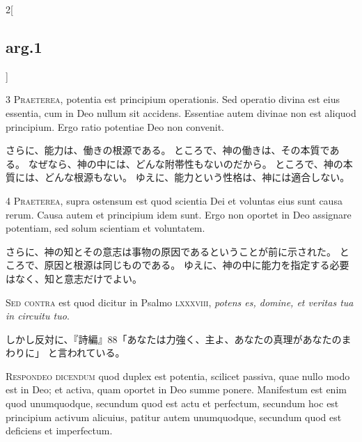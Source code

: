 \documentclass[paper=a4paper,fontsize=10pt,jafontsize=9pt,titlepage]{jlreq}
\begin{document}
\begin{paracol}{2}[\subsection{arg.1}]

{\scshape 3 Praeterea}, potentia est principium
operationis. Sed operatio divina est eius essentia, cum in Deo nullum
sit accidens. Essentiae autem divinae non est aliquod principium. Ergo
ratio potentiae Deo non convenit.

\switchcolumn

さらに、能力は、働きの根源である。
ところで、神の働きは、その本質である。
なぜなら、神の中には、どんな附帯性もないのだから。
ところで、神の本質には、どんな根源もない。
ゆえに、能力という性格は、神には適合しない。


{\scshape 4 Praeterea}, supra ostensum est quod scientia
Dei et voluntas eius sunt causa rerum. Causa autem et principium idem
sunt. Ergo non oportet in Deo assignare potentiam, sed solum scientiam
et voluntatem.

\switchcolumn

さらに、神の知とその意志は事物の原因であるということが前に示された。
ところで、原因と根源は同じものである。
ゆえに、神の中に能力を指定する必要はなく、知と意志だけでよい。

\switchcolumn*[\subsection{s.c.}]

{\scshape Sed contra} est quod dicitur in Psalmo
{\scshape lxxxviii}, {\itshape potens es, domine, et veritas tua in circuitu tuo}.

\switchcolumn

しかし反対に、『詩編』88「あなたは力強く、主よ、あなたの真理があなたのまわりに」
と言われている。


{\scshape Respondeo dicendum} quod duplex est potentia,
scilicet passiva, quae nullo modo est in Deo; et activa, quam oportet in
Deo summe ponere. Manifestum est enim quod unumquodque, secundum quod
est actu et perfectum, secundum hoc est principium activum alicuius,
patitur autem unumquodque, secundum quod est deficiens et
imperfectum.


\end{paracol}
\end{document}
